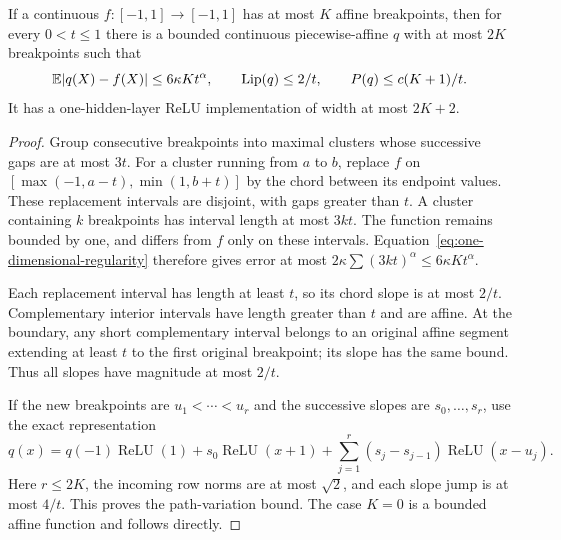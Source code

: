 \begin{lemma}
\label{lem:spline-path}
If a continuous $f:[-1,1]\to[-1,1]$ has at most $K$ affine
breakpoints, then for every $0<t\le1$ there is a bounded continuous
piecewise-affine $q$ with at most $2K$ breakpoints such that
\[
 \mathbb E|q(X)-f(X)|\le6\kappa Kt^\alpha,\qquad
 \operatorname{Lip}(q)\le2/t,
 \qquad P(q)\le c(K+1)/t.
\]
It has a one-hidden-layer ReLU implementation of width at most $2K+2$.
\end{lemma}
\begin{proof}
Group consecutive breakpoints into maximal clusters whose successive
gaps are at most $3t$. For a cluster running from $a$ to $b$, replace
$f$ on $[\max(-1,a-t),\min(1,b+t)]$ by the chord between its endpoint
values. These replacement intervals are disjoint, with gaps greater
than $t$. A cluster containing $k$ breakpoints has interval length at
most $3kt$. The function remains bounded by one, and differs from $f$
only on these intervals. Equation~\eqref{eq:one-dimensional-regularity}
therefore gives error at most
$2\kappa\sum(3kt)^\alpha\le6\kappa Kt^\alpha$.

Each replacement interval has length at least $t$, so its chord slope
is at most $2/t$. Complementary interior intervals have length greater
than $t$ and are affine. At the boundary, any short complementary
interval belongs to an original affine segment extending at least
$t$ to the first original breakpoint; its slope has the same bound.
Thus all slopes have magnitude at most $2/t$.

If the new breakpoints are $u_1<\cdots<u_r$ and the successive slopes
are $s_0,\ldots,s_r$, use the exact representation
\[
 q(x)=q(-1)\operatorname{ReLU}(1)
     +s_0\operatorname{ReLU}(x+1)
     +\sum_{j=1}^r(s_j-s_{j-1})\operatorname{ReLU}(x-u_j).
\]
Here $r\le2K$, the incoming row norms are at most $\sqrt2$, and each
slope jump is at most $4/t$. This proves the path-variation bound.
The case $K=0$ is a bounded affine function and follows directly.
\end{proof}

